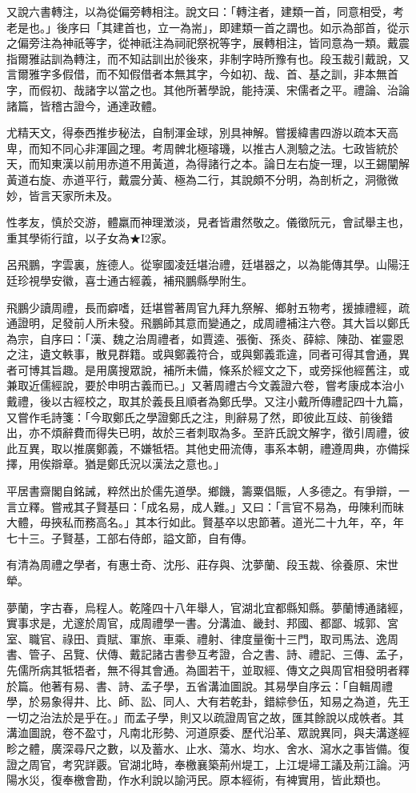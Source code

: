 \begin{pinyinscope}
又說六書轉注，以為從偏旁轉相注。說文曰：「轉注者，建類一首，同意相受，考老是也。」後序曰「其建首也，立一為耑」，即建類一首之謂也。如示為部首，從示之偏旁注為神祇等字，從神祇注為祠祀祭祝等字，展轉相注，皆同意為一類。戴震指爾雅詁訓為轉注，而不知詁訓出於後來，非制字時所豫有也。段玉裁引戴說，又言爾雅字多假借，而不知假借者本無其字，今如初、哉、首、基之訓，非本無首字，而假初、哉諸字以當之也。其他所著學說，能持漢、宋儒者之平。禮論、治論諸篇，皆稽古證今，通達政體。

尤精天文，得泰西推步秘法，自制渾金球，別具神解。嘗援緯書四游以疏本天高卑，而知不同心非渾圓之理。考周髀北極璿璣，以推古人測驗之法。七政皆統於天，而知東漢以前用赤道不用黃道，為得諸行之本。論日左右旋一理，以王錫闡解黃道右旋、赤道平行，戴震分黃、極為二行，其說頗不分明，為剖析之，洞徹微妙，皆言天家所未及。

性孝友，慎於交游，體羸而神理澂淡，見者皆肅然敬之。儀徵阮元，會試舉主也，重其學術行誼，以子女為★I2家。

呂飛鵬，字雲裏，旌德人。從寧國凌廷堪治禮，廷堪器之，以為能傳其學。山陽汪廷珍視學安徽，喜士通古經義，補飛鵬縣學附生。

飛鵬少讀周禮，長而癖嗜，廷堪嘗著周官九拜九祭解、鄉射五物考，援據禮經，疏通證明，足發前人所未發。飛鵬師其意而變通之，成周禮補注六卷。其大旨以鄭氏為宗，自序曰：「漢、魏之治周禮者，如賈逵、張衡、孫炎、薛綜、陳劭、崔靈恩之注，遺文軼事，散見群籍。或與鄭義符合，或與鄭義乖違，同者可得其會通，異者可博其旨趣。是用廣搜眾說，補所未備，條系於經文之下，或旁採他經舊注，或兼取近儒經說，要於申明古義而已。」又著周禮古今文義證六卷，嘗考康成本治小戴禮，後以古經校之，取其於義長且順者為鄭氏學。又注小戴所傳禮記四十九篇，又嘗作毛詩箋：「今取鄭氏之學證鄭氏之注，則辭易了然，即彼此互歧、前後錯出，亦不煩辭費而得失已明，故於三者刺取為多。至許氏說文解字，徵引周禮，彼此互異，取以推廣鄭義，不嫌牴牾。其他史冊流傳，事系本朝，禮遵周典，亦備採擇，用俟辯章。猶是鄭氏況以漢法之意也。」

平居書齋閣自銘誡，粹然出於儒先道學。鄉饑，籌粟倡賑，人多德之。有爭辯，一言立釋。嘗戒其子賢基曰：「成名易，成人難。」又曰：「言官不易為，毋陳利而昧大體，毋挾私而務高名。」其本行如此。賢基卒以忠節著。道光二十九年，卒，年七十三。子賢基，工部右侍郎，謚文節，自有傳。

有清為周禮之學者，有惠士奇、沈彤、莊存與、沈夢蘭、段玉裁、徐養原、宋世犖。

夢蘭，字古春，烏程人。乾隆四十八年舉人，官湖北宜都縣知縣。夢蘭博通諸經，實事求是，尤邃於周官，成周禮學一書。分溝洫、畿封、邦國、都鄙、城郭、宮室、職官、祿田、貢賦、軍旅、車乘、禮射、律度量衡十三門，取司馬法、逸周書、管子、呂覽、伏傳、戴記諸古書參互考證，合之書、詩、禮記、三傳、孟子，先儒所病其牴牾者，無不得其會通。為圖若干，並取經、傳文之與周官相發明者釋於篇。他著有易、書、詩、孟子學，五省溝洫圖說。其易學自序云：「自輯周禮學，於易象得井、比、師、訟、同人、大有若乾卦，錯綜參伍，知易之為道，先王一切之治法於是乎在。」而孟子學，則又以疏證周官之故，匯其餘說以成帙者。其溝洫圖說，卷不盈寸，凡南北形勢、河道原委、歷代沿革、眾說異同，與夫溝遂經畛之體，廣深尋尺之數，以及蓄水、止水、蕩水、均水、舍水、瀉水之事皆備。復證之周官，考究詳覈。官湖北時，奉檄襄築荊州堤工，上江堤埽工議及荊江論。沔陽水災，復奉檄會勘，作水利說以諭沔民。原本經術，有裨實用，皆此類也。


\end{pinyinscope}
